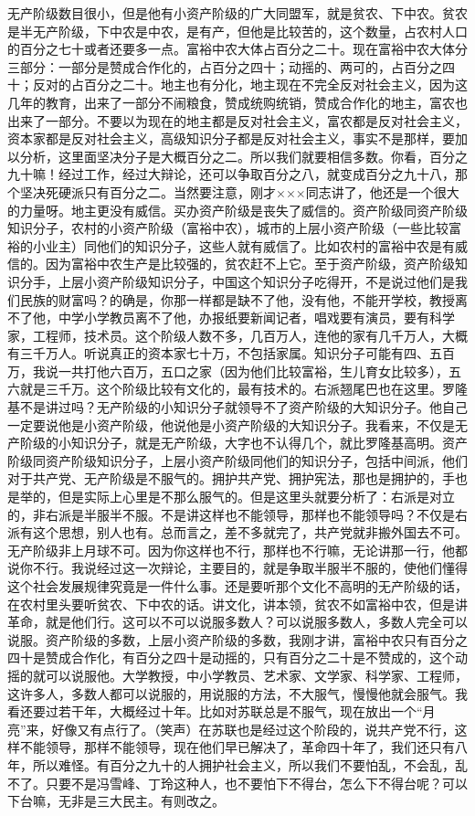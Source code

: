 无产阶级数目很小，但是他有小资产阶级的广大同盟军，就是贫农、下中农。贫农是半无产阶级，下中农是中农，是有产，但他是比较苦的，这个数量，占农村人口的百分之七十或者还要多一点。富裕中农大体占百分之二十。现在富裕中农大体分三部分：一部分是赞成合作化的，占百分之四十；动摇的、两可的，占百分之四十；反对的占百分之二十。地主也有分化，地主现在不完全反对社会主义，因为这几年的教育，出来了一部分不闹粮食，赞成统购统销，赞成合作化的地主，富农也出来了一部分。不要以为现在的地主都是反对社会主义，富农都是反对社会主义，资本家都是反对社会主义，高级知识分子都是反对社会主义，事实不是那样，要加以分析，这里面坚决分子是大概百分之二。所以我们就要相信多数。你看，百分之九十嘛！经过工作，经过大辩论，还可以争取百分之八，就变成百分之九十八，那个坚决死硬派只有百分之二。当然要注意，刚才×××同志讲了，他还是一个很大的力量呀。地主更没有威信。买办资产阶级是丧失了威信的。资产阶级同资产阶级知识分子，农村的小资产阶级（富裕中农），城市的上层小资产阶级（一些比较富裕的小业主）同他们的知识分子，这些人就有威信了。比如农村的富裕中农是有威信的。因为富裕中农生产是比较强的，贫农赶不上它。至于资产阶级，资产阶级知识分手，上层小资产阶级知识分子，中国这个知识分子吃得开，不是说过他们是我们民族的财富吗？的确是，你那一样都是缺不了他，没有他，不能开学校，教授离不了他，中学小学教员离不了他，办报纸要新闻记者，唱戏要有演员，要有科学家，工程师，技术员。这个阶级人数不多，几百万人，连他的家有几千万人，大概有三千万人。听说真正的资本家七十万，不包括家属。知识分子可能有四、五百万，我说一共打他六百万，五口之家（因为他们比较富裕，生儿育女比较多），五六就是三千万。这个阶级比较有文化的，最有技术的。右派翘尾巴也在这里。罗隆基不是讲过吗？无产阶级的小知识分子就领导不了资产阶级的大知识分子。他自己一定要说他是小资产阶级，他说他是小资产阶级的大知识分子。我看来，不仅是无产阶级的小知识分子，就是无产阶级，大字也不认得几个，就比罗隆基高明。资产阶级同资产阶级知识分子，上层小资产阶级同他们的知识分子，包括中间派，他们对于共产党、无产阶级是不服气的。拥护共产党、拥护宪法，那也是拥护的，手也是举的，但是实际上心里是不那么服气的。但是这里头就要分析了：右派是对立的，非右派是半服半不服。不是讲这样也不能领导，那样也不能领导吗？不仅是右派有这个思想，别人也有。总而言之，差不多就完了，共产党就非搬外国去不可。无产阶级非上月球不可。因为你这样也不行，那样也不行嘛，无论讲那一行，他都说你不行。我说经过这一次辩论，主要目的，就是争取半服半不服的，使他们懂得这个社会发展规律究竟是一件什么事。还是要听那个文化不高明的无产阶级的话，在农村里头要听贫农、下中农的话。讲文化，讲本领，贫农不如富裕中农，但是讲革命，就是他们行。这可以不可以说服多数人？可以说服多数人，多数人完全可以说服。资产阶级的多数，上层小资产阶级的多数，我刚才讲，富裕中农只有百分之四十是赞成合作化，有百分之四十是动摇的，只有百分之二十是不赞成的，这个动摇的就可以说服他。大学教授，中小学教员、艺术家、文学家、科学家、工程师，这许多人，多数人都可以说服的，用说服的方法，不大服气，慢慢他就会服气。我看还要过若干年，大概经过十年。比如对苏联总是不服气，现在放出一个“月亮”来，好像又有点行了。（笑声）在苏联也是经过这个阶段的，说共产党不行，这样不能领导，那样不能领导，现在他们早已解决了，革命四十年了，我们还只有八年，所以难怪。有百分之九十的人拥护社会主义，所以我们不要怕乱，不会乱，乱不了。只要不是冯雪峰、丁玲这种人，也不要怕下不得台，怎么下不得台呢？可以下台嘛，无非是三大民主。有则改之。

